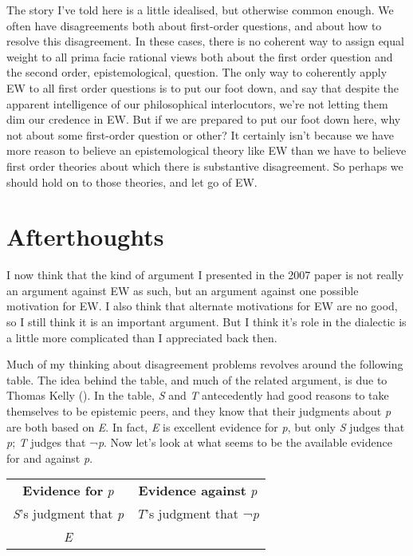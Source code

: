 \documentclass[
  10pt,
  letterpaper,
  DIV=11,
  numbers=noendperiod,
  twoside]{scrartcl}
\begin{document}
The story I've told here is a little idealised, but otherwise common
enough. We often have disagreements both about first-order questions,
and about how to resolve this disagreement. In these cases, there is no
coherent way to assign equal weight to all prima facie rational views
both about the first order question and the second order,
epistemological, question. The only way to coherently apply EW to all
first order questions is to put our foot down, and say that despite the
apparent intelligence of our philosophical interlocutors, we're not
letting them dim our credence in EW. But if we are prepared to put our
foot down here, why not about some first-order question or other? It
certainly isn't because we have more reason to believe an
epistemological theory like EW than we have to believe first order
theories about which there is substantive disagreement. So perhaps we
should hold on to those theories, and let go of EW.

\section*{Afterthoughts}\label{afterthoughts}

I now think that the kind of argument I presented in the 2007 paper is
not really an argument against EW as such, but an argument against one
possible motivation for EW. I also think that alternate motivations for
EW are no good, so I still think it is an important argument. But I
think it's role in the dialectic is a little more complicated than I
appreciated back then.

Much of my thinking about disagreement problems revolves around the
following table. The idea behind the table, and much of the related
argument, is due to Thomas Kelly
(). In the table, \emph{S} and
\emph{T} antecedently had good reasons to take themselves to be
epistemic peers, and they know that their judgments about \emph{p} are
both based on \emph{E}. In fact, \emph{E} is excellent evidence for
\emph{p}, but only \emph{S} judges that \emph{p}; \emph{T} judges that
¬\emph{p}. Now let's look at what seems to be the available evidence for
and against \emph{p}.

\begin{longtable}[]{@{}cc@{}}
\toprule\noalign{}
\endhead
\bottomrule\noalign{}
\endlastfoot
\textbf{Evidence for} \emph{p} & \textbf{Evidence against} \emph{p} \\
\emph{S}'s judgment that \emph{p} & \emph{T}'s judgment that
¬\emph{p} \\
\emph{E} & \\
\end{longtable}
\end{document}
